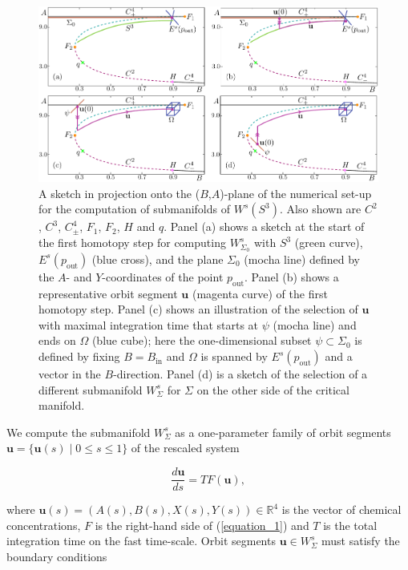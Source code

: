 \documentclass{ws-ijbc}
\begin{document}
\begin{figure}[t!]
\centering
\includegraphics[]{./figures/MKMO_3.pdf}
\caption{A sketch in projection onto the ($B$,$A$)-plane of the numerical set-up for the computation of submanifolds of $W^s(S^3)$.  Also shown are $C^2$, $C^3$, $C^4_\pm$, $F_1$, $F_2$, $H$ and $q$.  Panel (a) shows a sketch at the start of the first homotopy step for computing $W^{s}_{\Sigma_0}$ with $S^3$ (green curve), $E^s(p_{\text{out}})$ (blue cross), and the plane $\Sigma_0$ (mocha line) defined by the $A$- and $Y$-coordinates of the point $p_{\text{out}}$.  Panel (b) shows a representative orbit segment $\mathbf{u}$ (magenta curve) of the first homotopy step.  Panel (c) shows an illustration of the selection of $\mathbf{u}$ with maximal integration time that starts at $\psi$ (mocha line) and ends on $\Omega$ (blue cube); here the one-dimensional subset $\psi \subset \Sigma_0$ is defined by fixing $B = B_{\text{in}}$ and $\Omega$ is spanned by $E^s(p_{\text{out}})$ and a vector in the $B$-direction. Panel (d) is a sketch of the selection of a different submanifold $W^{s}_{\Sigma}$ for $\Sigma$ on the other side of the critical manifold.}
\label{figure_3}
\end{figure}


We compute the submanifold $W^s_{\Sigma}$ as a one-parameter family of orbit segments $\mathbf{u} = \{\mathbf{u}(s) \;|\; 0 \leq s \leq 1 \}$ of the rescaled system

\begin{equation}
\frac{d\mathbf{u}}{ds} = TF(\mathbf{u}),
\label{equation_4}
\end{equation}
    
\noindent
where $\mathbf{u}(s) = (A(s), B(s), X(s), Y(s)) \in \mathbb{R}^4$ is the vector of chemical concentrations, $F$ is the right-hand side of (\ref{equation_1}) and $T$ is the total integration time on the fast time-scale.  Orbit segments $\mathbf{u} \in W^s_{\Sigma}$ must satisfy the boundary conditions
\end{document}
